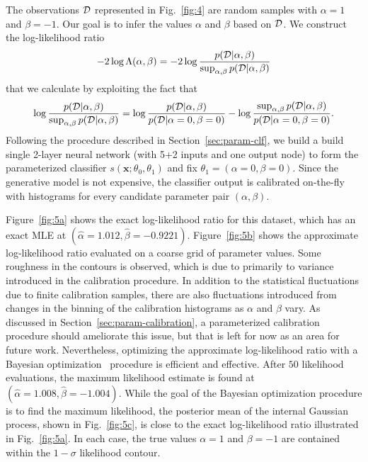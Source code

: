 \documentclass[12pt]{article}
\numberwithin{equation}{section}
\theoremstyle{plain}
\begin{document}
The observations ${\cal D}$ represented in Fig.~\ref{fig:4}
are random samples with $\alpha=1$ and $\beta=-1$.
Our goal is to infer the values $\alpha$ and $\beta$ based on ${\cal D}$.
We construct the log-likelihood ratio
\begin{equation}\label{eqn:obj-ex2}
    -2 \log \Lambda(\alpha, \beta ) = -2 \log \frac{p({\cal D} | \alpha, \beta)}{ \sup_{\alpha,\beta} p({\cal D} | \alpha, \beta) }
\end{equation}
that we calculate by exploiting the fact that
\begin{equation}\label{eqn:obj-ex2-expanded}
\log \frac{p({\cal D} | \alpha, \beta)}{ \sup_{\alpha,\beta} p({\cal D} | \alpha, \beta) } = \log \frac{p({\cal D} | \alpha, \beta)}{ p({\cal D} | \alpha=0, \beta=0) } - \log \frac{ \sup_{\alpha,\beta} p({\cal D} | \alpha, \beta) }{ p({\cal D} | \alpha=0, \beta=0)}.
\end{equation}
Following the procedure described in Section~\ref{sec:param-clf}, we build
a build single 2-layer neural network (with 5+2 inputs and one output node) to form the parameterized classifier $s(\mathbf{x}; \theta_0, \theta_1)$ and fix $\theta_1=(\alpha=0, \beta=0)$.
Since the generative model is not expensive, the classifier output is calibrated
on-the-fly with histograms for  every candidate parameter pair $(\alpha,\beta)$.

Figure~\ref{fig:5a} shows the exact log-likelihood ratio for this dataset, which has an exact MLE at $(\hat \alpha=1.012, \hat \beta=-0.9221)$.
Figure~\ref{fig:5b} shows the approximate log-likelihood ratio evaluated on a coarse grid of parameter values. Some roughness in the contours is observed, which is due to primarily to variance introduced in the calibration procedure. In addition to the statistical fluctuations due to finite calibration samples, there are also fluctuations introduced from changes in the binning of the calibration histograms as $\alpha$ and $\beta$ vary. As discussed in Section~\ref{sec:param-calibration}, a parameterized calibration
procedure should ameliorate this issue, but that is left for now as an area for future work.
Nevertheless, optimizing the approximate log-likelihood ratio with
a Bayesian optimization~\citep{brochu2010tutorial} procedure is efficient and effective.
After $50$ likelihood evaluations, the maximum likelihood estimate is found at $(\hat \alpha=1.008, \hat \beta=-1.004)$.
While the goal of the Bayesian optimization procedure is to find the maximum likelihood, the posterior mean of the
internal Gaussian process, shown in Fig.~\ref{fig:5c}, is close to the exact log-likelihood ratio illustrated in Fig.~\ref{fig:5a}.
In each case, the true values $\alpha=1$ and $\beta=-1$ are contained within the $1-\sigma$ likelihood contour.
\end{document}
